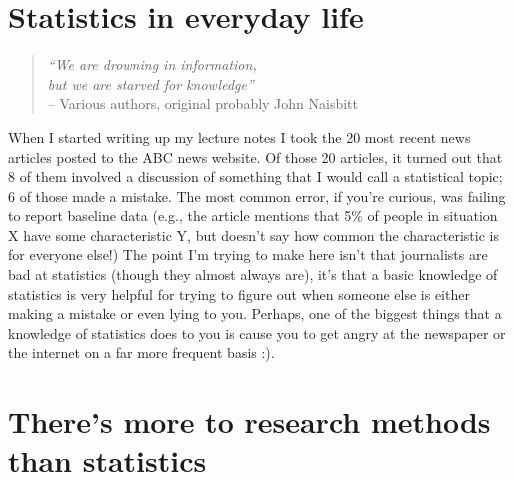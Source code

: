 \documentclass[
]{book}
\begin{document}
\section{Statistics in everyday life}\label{statistics-in-everyday-life}

\begin{quote}
\emph{``We are drowning in information,\\
but we are starved for knowledge''}\\

-- Various authors, original probably John Naisbitt
\end{quote}

When I started writing up my lecture notes I took the 20 most recent news articles posted to the ABC news website. Of those 20 articles, it turned out that 8 of them involved a discussion of something that I would call a statistical topic; 6 of those made a mistake. The most common error, if you're curious, was failing to report baseline data (e.g., the article mentions that 5\% of people in situation X have some characteristic Y, but doesn't say how common the characteristic is for everyone else!) The point I'm trying to make here isn't that journalists are bad at statistics (though they almost always are), it's that a basic knowledge of statistics is very helpful for trying to figure out when someone else is either making a mistake or even lying to you. Perhaps, one of the biggest things that a knowledge of statistics does to you is cause you to get angry at the newspaper or the internet on a far more frequent basis :).

\section{There's more to research methods than statistics}\label{theres-more-to-research-methods-than-statistics}
\end{document}
